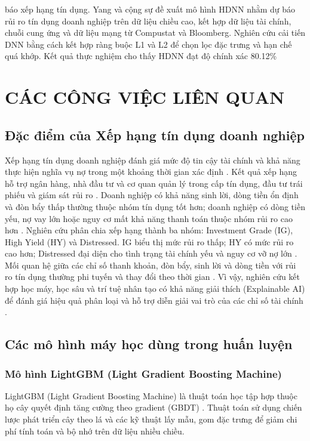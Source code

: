 \documentclass[10pt,twoside]{article}
\begin{document}
báo xếp hạng tín dụng. Yang và cộng sự \cite{yang_deep_2023} đề xuất mô hình HDNN nhằm dự báo rủi ro tín dụng doanh nghiệp trên dữ liệu chiều cao, kết hợp dữ liệu tài chính, chuỗi cung ứng và dữ liệu mạng từ Compustat và Bloomberg. Nghiên cứu cải tiến DNN bằng cách kết hợp ràng buộc L1 và L2 để chọn lọc đặc trưng và hạn chế quá khớp. Kết quả thực nghiệm cho thấy HDNN đạt độ chính xác 80.12\%

\section{CÁC CÔNG VIỆC LIÊN QUAN}

\subsection{Đặc điểm của Xếp hạng tín dụng doanh nghiệp}

Xếp hạng tín dụng doanh nghiệp đánh giá mức độ tin cậy tài chính và khả năng thực hiện nghĩa vụ nợ trong một khoảng thời gian xác định \cite{phu_nghi_nodate}. Kết quả xếp hạng hỗ trợ ngân hàng, nhà đầu tư và cơ quan quản lý trong cấp tín dụng, đầu tư trái phiếu và giám sát rủi ro \cite{hai_mo_2023}. Doanh nghiệp có khả năng sinh lời, dòng tiền ổn định và đòn bẩy thấp thường thuộc nhóm tín dụng tốt hơn; doanh nghiệp có dòng tiền yếu, nợ vay lớn hoặc nguy cơ mất khả năng thanh toán thuộc nhóm rủi ro cao hơn \cite{thuy_ung_2023}. Nghiên cứu phân chia xếp hạng thành ba nhóm: Investment Grade (IG), High Yield (HY) và Distressed. IG biểu thị mức rủi ro thấp; HY có mức rủi ro cao hơn; Distressed đại diện cho tình trạng tài chính yếu và nguy cơ vỡ nợ lớn \cite{hung_xep_2023}. Mối quan hệ giữa các chỉ số thanh khoản, đòn bẩy, sinh lời và dòng tiền với rủi ro tín dụng thường phi tuyến và thay đổi theo thời gian \cite{hai_mo_2023}. Vì vậy, nghiên cứu kết hợp học máy, học sâu và trí tuệ nhân tạo có khả năng giải thích (Explainable AI) để đánh giá hiệu quả phân loại và hỗ trợ diễn giải vai trò của các chỉ số tài chính \cite{gramegna_shap_2021}.
\subsection{Các mô hình máy học dùng trong huấn luyện}

\subsubsection{Mô hình LightGBM (Light Gradient Boosting Machine)}
LightGBM (Light Gradient Boosting Machine) là thuật toán học tập hợp thuộc họ cây quyết định tăng cường theo gradient (GBDT) \cite{ke_lightgbm_2017}. Thuật toán sử dụng chiến lược phát triển cây theo lá và các kỹ thuật lấy mẫu, gom đặc trưng để giảm chi phí tính toán và bộ nhớ trên dữ liệu nhiều chiều.
\end{document}
